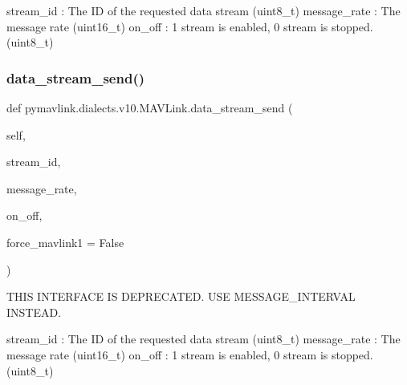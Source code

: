 \begin{DoxyVerb}
\begin{DoxyVerb}
\begin{DoxyVerb}
stream_id                 : The ID of the requested data stream (uint8_t)
message_rate              : The message rate (uint16_t)
on_off                    : 1 stream is enabled, 0 stream is stopped. (uint8_t)\end{DoxyVerb}
 \mbox{\label{classpymavlink_1_1dialects_1_1v10_1_1MAVLink_a998519d240b758d15071c5285ccf05df}} 
\subsubsection{\texorpdfstring{data\+\_\+stream\+\_\+send()}{data\_stream\_send()}}
{\footnotesize\ttfamily def pymavlink.\+dialects.\+v10.\+M\+A\+V\+Link.\+data\+\_\+stream\+\_\+send (\begin{DoxyParamCaption}\item[{}]{self,  }\item[{}]{stream\+\_\+id,  }\item[{}]{message\+\_\+rate,  }\item[{}]{on\+\_\+off,  }\item[{}]{force\+\_\+mavlink1 = {\ttfamily False} }\end{DoxyParamCaption})}

\begin{DoxyVerb}THIS INTERFACE IS DEPRECATED. USE MESSAGE_INTERVAL INSTEAD.

stream_id                 : The ID of the requested data stream (uint8_t)
message_rate              : The message rate (uint16_t)
on_off                    : 1 stream is enabled, 0 stream is stopped. (uint8_t)\end{DoxyVerb}
 \mbox{\label{classpymavlink_1_1dialects_1_1v10_1_1MAVLink_a57a74e2dec63d844409f787d2d19f21d}} 

\end{DoxyVerb}
\end{DoxyVerb}

